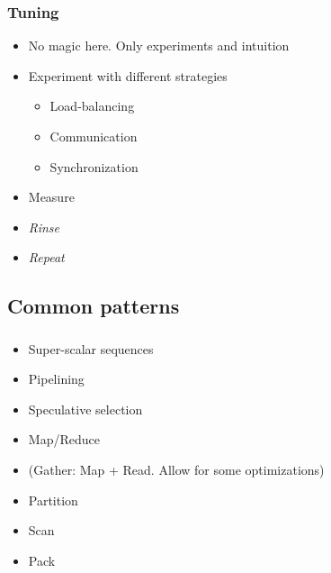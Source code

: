 \begin{frame}
  \frametitle{Tuning}
  \begin{itemize}
  \item No magic here. Only experiments and intuition
  \item Experiment with different strategies
    \begin{itemize}
    \item Load-balancing
    \item Communication
    \item Synchronization
    \end{itemize}
  \item Measure
  \item \emph{Rinse}
  \item \emph{Repeat}
  \end{itemize}
\end{frame}


\subsection{Common patterns}
\label{subsec:parpatterns}

\begin{frame}
  \frametitle{}
  \begin{itemize}
  \item Super-scalar sequences
  \item Pipelining
  \item Speculative selection
  \item Map/Reduce
  \item (Gather: Map + Read. Allow for some optimizations)
  \item Partition
  \item Scan
  \item Pack
  \end{itemize}

\end{frame}
